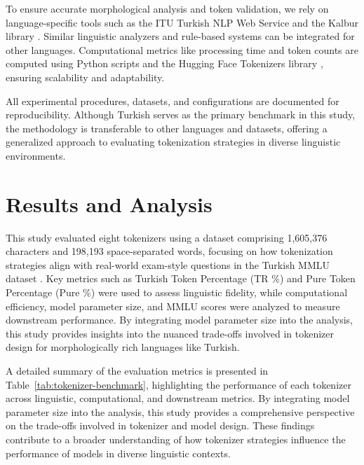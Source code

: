 \documentclass{article}
\begin{document}
  To ensure accurate morphological analysis and token validation, we rely on language-specific tools such as the ITU Turkish NLP Web Service \cite{eryigit_itu_2014} and the Kalbur library \cite{aksoy_ahmetaxkalbur_2024}. Similar linguistic analyzers and rule-based systems can be integrated for other languages. Computational metrics like processing time and token counts are computed using Python scripts and the Hugging Face Tokenizers library \cite{neubeck_so_2024}, ensuring scalability and adaptability.
  
  All experimental procedures, datasets, and configurations are documented for reproducibility. Although Turkish serves as the primary benchmark in this study, the methodology is transferable to other languages and datasets, offering a generalized approach to evaluating tokenization strategies in diverse linguistic environments.
  \section{Results and Analysis}

  This study evaluated eight tokenizers using a dataset comprising 1,605,376 characters and 198,193 space-separated words, focusing on how tokenization strategies align with real-world exam-style questions in the Turkish MMLU dataset \cite{bayram_turkish_nodate}. Key metrics such as Turkish Token Percentage (TR \%) and Pure Token Percentage (Pure \%) were used to assess linguistic fidelity, while computational efficiency, model parameter size, and MMLU scores were analyzed to measure downstream performance. By integrating model parameter size into the analysis, this study provides insights into the nuanced trade-offs involved in tokenizer design for morphologically rich languages like Turkish.
  
  A detailed summary of the evaluation metrics is presented in Table~\ref{tab:tokenizer-benchmark}, highlighting the performance of each tokenizer across linguistic, computational, and downstream metrics. By integrating model parameter size into the analysis, this study provides a comprehensive perspective on the trade-offs involved in tokenizer and model design. These findings contribute to a broader understanding of how tokenizer strategies influence the performance of models in diverse linguistic contexts.
  
\end{document}
